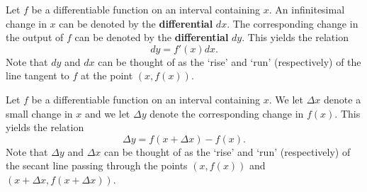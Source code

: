 \documentclass[mathNotesPreamble]{subfiles}
\begin{document}
%  
%    

\begin{defn*}[Differentials]
    Let $f$ be a differentiable function on an interval containing $x$. An infinitesimal change in $x$ can be denoted by the \textbf{differential} $dx$. The corresponding change in the output of $f$ can be denoted by the \textbf{differential} $dy$. This yields the relation
        $$dy = f'(x)dx.$$
    Note that $dy$ and $dx$ can be thought of as the `rise' and `run' (respectively) of the line tangent to $f$ at the point $(x,f(x))$.
\end{defn*}

\begin{defn*}
    Let $f$ be a differentiable function on an interval containing $x$. We let $\Delta x$ denote a small change in $x$ and we let $\Delta y$ denote the corresponding change in $f(x)$. This yields the relation
        $$\Delta y = f(x+\Delta x) - f(x).$$
    Note that $\Delta y$ and $\Delta x$ can be thought of as the `rise' and `run' (respectively) of the secant line passing through the points $(x,f(x))$ and $(x+\Delta x, f(x+\Delta x))$.
\end{defn*}

\noindent
{}
\pagebreak
\end{document}
